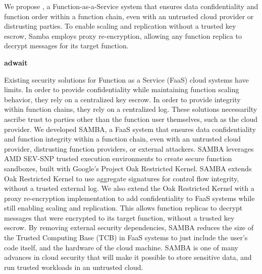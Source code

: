 %
We propose \SystemName, a Function-as-a-Service system that ensures data
confidentiality and function order within a function chain, even with an
untrusted cloud provider or distrusting parties.
%
%
To enable scaling and replication without a trusted key escrow, Samba employs
proxy re-encryption, allowing any function replica to decrypt messages for its
target function.


\textbf{adwait}


Existing security solutions for Function as a Service (FaaS) cloud systems have limits.
In order to provide confidentiality while maintaining function scaling behavior, they rely on a centralized key escrow.
In order to provide integrity within function chains, they rely on a centralized log.
These solutions necessarilty ascribe trust to parties other than the function user themselves, such as the cloud provider.
We developed SAMBA, a FaaS system that ensures data confidentiality and function integrity within a function chain, even with an untrusted cloud
provider, distrusting function providers, or external attackers.
SAMBA leverages AMD SEV-SNP trusted execution environments
to create secure function sandboxes, built with Google's Project Oak Restricted Kernel.
SAMBA extends Oak Restricted Kernel to use aggregate signatures for control flow integrity, without a trusted external log.
We also extend the Oak Restricted Kernel with a proxy re-encryption implementation to add confidentiality to FaaS systems while still enabling scaling and replication.
This allows function replicas to decrypt messages that were encrypted to its target function, without a trusted key escrow.
By removing external security dependencies, SAMBA reduces the size of the Trusted Computing Base (TCB) in FaaS systems to just include the user's code itself, and the hardware of the cloud machine.
SAMBA is one of many advances in cloud security that will make it possible to store sensitive data, and run trusted workloads in an untrusted cloud.



